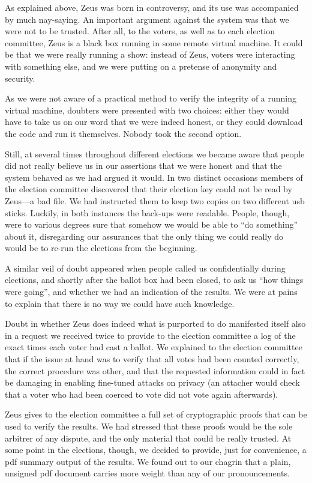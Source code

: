 \documentclass[jets]{usenixjournal}
\begin{document}
As explained above, Zeus was born in controversy, and its use was
accompanied by much nay-saying. An important argument against the
system was that we were not to be trusted. After all, to the voters,
as well as to each election committee, Zeus is a black box running in
some remote virtual machine. It could be that we were really running a
show: instead of Zeus, voters were interacting with something else, and
we were putting on a pretense of anonymity and security. 

As we were not aware of a practical method to verify the integrity of
a running virtual machine, doubters were presented with two choices:
either they would have to take us on our word that we were indeed
honest, or they could download the code and run it themselves. Nobody
took the second option. 

Still, at several times throughout different elections we became aware
that people did not really believe us in our assertions that we were
honest and that the system behaved as we had argued it would. In two
distinct occasions members of the election committee discovered that
their election key could not be read by Zeus---a bad file. We had
instructed them to keep two copies on two different {\sc usb} sticks.
Luckily, in both instances the back-ups were readable. People, though,
were to various degrees sure that somehow we would be able to ``do
something'' about it, disregarding our assurances that the only thing
we could really do would be to re-run the elections from the beginning.

A similar veil of doubt appeared when people called us confidentially
during elections, and shortly after the ballot box had been closed, to
ask us ``how things were going'', and whether we had an indication of
the results. We were at pains to explain that there is no way we could
have such knowledge.

Doubt in whether Zeus does indeed what is purported to do manifested
itself also in a request we received twice to provide to the election
committee a log of the exact times each voter had cast a ballot. We
explained to the election committee that if the issue at hand was to
verify that all votes had been counted correctly, the correct
procedure was other, and that the requested information could in fact
be damaging in enabling fine-tuned attacks on privacy (an attacher
would check that a voter who had been coerced to vote did not vote
again afterwards). 

Zeus gives to the election committee a full set of cryptographic
proofs that can be used to verify the results. We had stressed that
these proofs would be the sole arbitrer of any dispute, and the only
material that could be really trusted. At some point in the elections,
though, we decided to provide, just for convenience, a {\sc pdf}
summary output of the results. We found out to our chagrin that a
plain, unsigned {\sc pdf} document carries more weight than any of our
pronouncements.
\end{document}
